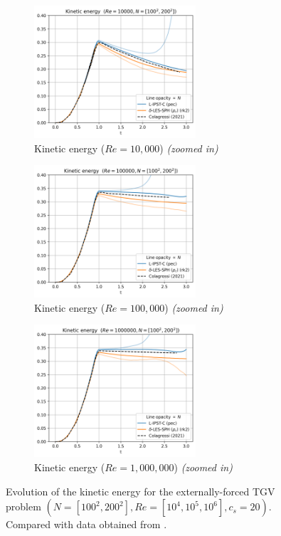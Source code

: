 \begin{figure}[htbp!]
  \begin{subfigure}{7cm}
  \centering\includegraphics[width=6cm]{Code-Figures/ext-force-tgv/limit_ke_re_10000.png}
  \caption{Kinetic energy ($Re = 10,000$) \textit{(zoomed in)}}
  \end{subfigure}
  \begin{subfigure}{7cm}
  \centering\includegraphics[width=6cm]{Code-Figures/ext-force-tgv/limit_ke_re_100000.png}
  \caption{Kinetic energy ($Re = 100,000$) \textit{(zoomed in)}}
  \end{subfigure}
  \begin{subfigure}{7cm}
  \centering\includegraphics[width=6cm]{Code-Figures/ext-force-tgv/limit_ke_re_1000000.png}
  \caption{Kinetic energy ($Re = 1,000,000$) \textit{(zoomed in)}}
  \end{subfigure}
  \caption{Evolution of the kinetic energy for the externally-forced TGV problem $(N=[100^2, 200^2], Re=[10^4, 10^5, 10^6], c_s=20)$. Compared with data obtained from \cite{Colagrossi2021QuasiLagrangian}.}
  \label{fig:tgv-forced-ke}
\end{figure}


